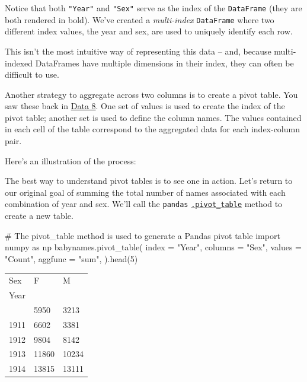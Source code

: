 \documentclass[
  letterpaper,
  DIV=11,
  numbers=noendperiod]{scrreprt}
\newenvironment{Shaded}{\begin{snugshade}}{\end{snugshade}}
\newcommand{\CommentTok}[1]{\textcolor[rgb]{0.37,0.37,0.37}{#1}}
\newcommand{\DecValTok}[1]{\textcolor[rgb]{0.68,0.00,0.00}{#1}}
\newcommand{\ImportTok}[1]{\textcolor[rgb]{0.00,0.46,0.62}{#1}}
\newcommand{\NormalTok}[1]{\textcolor[rgb]{0.00,0.23,0.31}{#1}}
\newcommand{\OperatorTok}[1]{\textcolor[rgb]{0.37,0.37,0.37}{#1}}
\newcommand{\StringTok}[1]{\textcolor[rgb]{0.13,0.47,0.30}{#1}}
\begin{document}
Notice that both \texttt{"Year"} and \texttt{"Sex"} serve as the index
of the \texttt{DataFrame} (they are both rendered in bold). We've
created a \emph{multi-index} \texttt{DataFrame} where two different
index values, the year and sex, are used to uniquely identify each row.

This isn't the most intuitive way of representing this data -- and,
because multi-indexed DataFrames have multiple dimensions in their
index, they can often be difficult to use.

Another strategy to aggregate across two columns is to create a pivot
table. You saw these back in
\href{https://inferentialthinking.com/chapters/08/3/Cross-Classifying_by_More_than_One_Variable.html\#pivot-tables-rearranging-the-output-of-group}{Data
8}. One set of values is used to create the index of the pivot table;
another set is used to define the column names. The values contained in
each cell of the table correspond to the aggregated data for each
index-column pair.

Here's an illustration of the process:

The best way to understand pivot tables is to see one in action. Let's
return to our original goal of summing the total number of names
associated with each combination of year and sex. We'll call the
\texttt{pandas}
\href{https://pandas.pydata.org/pandas-docs/stable/reference/api/pandas.pivot_table.html}{\texttt{.pivot\_table}}
method to create a new table.

\begin{Shaded}
\begin{Highlighting}[]
\CommentTok{\# The \textasciigrave{}pivot\_table\textasciigrave{} method is used to generate a Pandas pivot table}
\ImportTok{import}\NormalTok{ numpy }\ImportTok{as}\NormalTok{ np}
\NormalTok{babynames.pivot\_table(}
\NormalTok{    index }\OperatorTok{=} \StringTok{"Year"}\NormalTok{,}
\NormalTok{    columns }\OperatorTok{=} \StringTok{"Sex"}\NormalTok{,    }
\NormalTok{    values }\OperatorTok{=} \StringTok{"Count"}\NormalTok{, }
\NormalTok{    aggfunc }\OperatorTok{=} \StringTok{"sum"}\NormalTok{, }
\NormalTok{).head(}\DecValTok{5}\NormalTok{)}
\end{Highlighting}
\end{Shaded}

\begin{longtable}[]{@{}lll@{}}
\toprule\noalign{}
Sex & F & M \\
Year & & \\
\midrule\noalign{}
\endhead
\bottomrule\noalign{}
\endlastfoot
1910 & 5950 & 3213 \\
1911 & 6602 & 3381 \\
1912 & 9804 & 8142 \\
1913 & 11860 & 10234 \\
1914 & 13815 & 13111 \\
\end{longtable}
\end{document}
